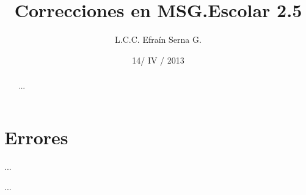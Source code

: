 \documentclass[12pt,spanish,twocolumn]{article}
\title{Correcciones en MSG.Escolar 2.5}
\author{L.C.C. Efra\'in Serna G.}
\date{14/ IV / 2013}
\begin{document}
\maketitle
\tableofcontents
\begin{abstract}
...
\end{abstract}

\section{Errores}
...

...
\end{document}
